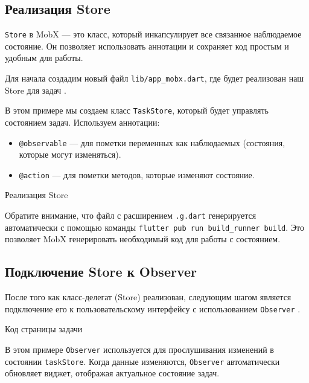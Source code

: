 \subsection{Реализация Store}

\texttt{Store} в MobX --- это класс,
который инкапсулирует все связанное наблюдаемое состояние.
Он позволяет использовать аннотации
и сохраняет код простым и удобным для работы.

Для начала создадим новый файл \texttt{lib/app\_mobx.dart},
где будет реализован наш Store для задач .

В этом примере мы создаем класс \texttt{TaskStore},
который будет управлять состоянием задач.
Используем аннотации:

\begin{itemize}
    \item \texttt{@observable} --- для пометки переменных
		как наблюдаемых (состояния, которые могут изменяться).
    \item \texttt{@action} --- для пометки методов,
		которые изменяют состояние.
\end{itemize}

\begin{image}
	\caption{Реализация Store}
	\label{fig:mobx:store}
\end{image}

Обратите внимание,
что файл с расширением \texttt{.g.dart} генерируется автоматически
с помощью команды \texttt{flutter pub run build\_runner build}.
Это позволяет MobX генерировать необходимый код для работы с состоянием.

\subsection{Подключение Store к Observer}

После того как класс-делегат (Store) реализован,
следующим шагом является подключение
его к пользовательскому интерфейсу с использованием \texttt{Observer}
.

\begin{image}
	\caption{Код страницы задачи}
	\label{fig:mobx:list:screen}
\end{image}

В этом примере \texttt{Observer} используется для прослушивания изменений
в состоянии \texttt{taskStore}.
Когда данные изменяются, \texttt{Observer} автоматически обновляет виджет,
отображая актуальное состояние задач.

